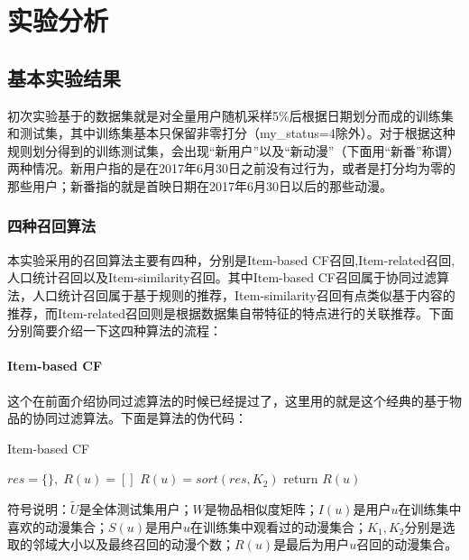 
\chapter{实验分析}
\section{基本实验结果}
初次实验基于的数据集就是对全量用户随机采样5\%后根据日期划分而成的训练集和测试集，其中训练集基本只保留非零打分（my\_status=4除外）。对于根据这种规则划分得到的训练测试集，会出现“新用户”以及“新动漫”（下面用“新番”称谓）两种情况。新用户指的是在2017年6月30日之前没有过行为，或者是打分均为零的那些用户；新番指的就是首映日期在2017年6月30日以后的那些动漫。
\subsection{四种召回算法}
本实验采用的召回算法主要有四种，分别是Item-based CF召回,Item-related召回, 人口统计召回以及Item-similarity召回。其中Item-based CF召回属于协同过滤算法，人口统计召回属于基于规则的推荐，Item-similarity召回有点类似基于内容的推荐，而Item-related召回则是根据数据集自带特征的特点进行的关联推荐。下面分别简要介绍一下这四种算法的流程：
\subsubsection{Item-based CF}
这个在前面介绍协同过滤算法的时候已经提过了，这里用的就是这个经典的基于物品的协同过滤算法\cite{wang2006unifying}。下面是算法的伪代码：
\begin{algorithm}[htbp]
	\caption{Item-based CF}
	$res=\{\},\;R(u)=[]$\;
	$R(u)=sort(res,K_2)$\;
	return $R(u)$\;
\end{algorithm}
符号说明：$\tilde{U}$是全体测试集用户；$W$是物品相似度矩阵；$I(u)$是用户$u$在训练集中喜欢的动漫集合；$S(u)$是用户$u$在训练集中观看过的动漫集合；$K_1,K_2$分别是选取的邻域大小以及最终召回的动漫个数；$R(u)$是最后为用户$u$召回的动漫集合。

